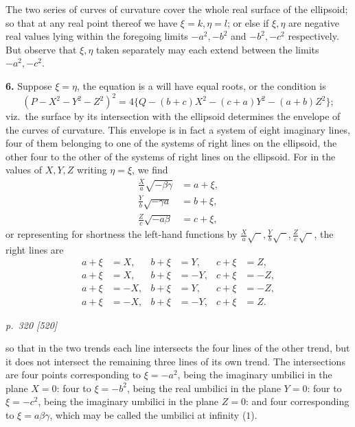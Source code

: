 \documentclass[11pt,a4paper]{book}
\begin{document}
The two series of curves of curvature cover the whole real surface of the ellipsoid; so that at any real point thereof we have $\xi = k, \eta = l$; or else if $\xi, \eta$ are negative real values lying within the foregoing limits $-a^2, -b^2$ and $-b^2, -c^2$ respectively. But observe that $\xi, \eta$ taken separately may each extend between the limits $-a^2, -c^2$.

\textbf{6.} Suppose $\xi = \eta$, the equation is a will have equal roots, or the condition is
\[
(P - X^2 - Y^2 - Z^2)^2 = 4\{Q - (b + c)X^2 - (c + a)Y^2 - (a + b)Z^2\};
\]
viz.\ the surface by its intersection with the ellipsoid determines the envelope of the curves of curvature. This envelope is in fact a system of eight imaginary lines, four of them belonging to one of the systems of right lines on the ellipsoid, the other four to the other of the systems of right lines on the ellipsoid. For in the values of $X, Y, Z$ writing $\eta = \xi$, we find
\begin{align*}
\tfrac{X}{a}\sqrt{-\beta\gamma} &= a + \xi,\\
\tfrac{Y}{b}\sqrt{-\gamma a} &= b + \xi,\\
\tfrac{Z}{c}\sqrt{-a\beta} &= c + \xi,
\end{align*}
or representing for shortness the left-hand functions by $\tfrac{X}{a}\sqrt{\phantom{x}}, \tfrac{Y}{b}\sqrt{\phantom{x}}, \tfrac{Z}{c}\sqrt{\phantom{x}}$, the right lines are
\begin{align*}
a + \xi &= X,& b + \xi &= Y,& c + \xi &= Z,\\
a + \xi &= X,& b + \xi &= -Y,& c + \xi &= -Z,\\
a + \xi &= -X,& b + \xi &= Y,& c + \xi &= -Z,\\
a + \xi &= -X,& b + \xi &= -Y,& c + \xi &= Z.
\end{align*}

\clearpage

\bigskip
\textit{p.~320 [520]}
\smallskip

so that in the two trends each line intersects the four lines of the other trend, but it does not intersect the remaining three lines of its own trend. The intersections are four points corresponding to $\xi = -a^2$, being the imaginary umbilici in the plane $X = 0$: four to $\xi = -b^2$, being the real umbilici in the plane $Y = 0$: four to $\xi = -c^2$, being the imaginary umbilici in the plane $Z = 0$: and four corresponding to $\xi = a\beta\gamma$, which may be called the umbilici at infinity ($1$).
\end{document}
